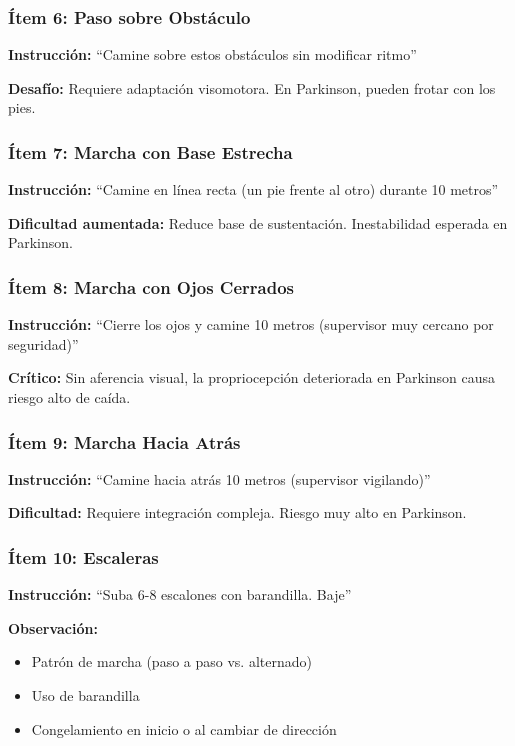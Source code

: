 \documentclass[12pt,a4paper,spanish,oneside]{book}
\begin{document}
\subsubsection{Ítem 6: Paso sobre Obstáculo}

\textbf{Instrucción:} ``Camine sobre estos obstáculos sin modificar ritmo''

\textbf{Desafío:} Requiere adaptación visomotora. En Parkinson, pueden frotar con los pies.

\subsubsection{Ítem 7: Marcha con Base Estrecha}

\textbf{Instrucción:} ``Camine en línea recta (un pie frente al otro) durante 10 metros''

\textbf{Dificultad aumentada:} Reduce base de sustentación. Inestabilidad esperada en Parkinson.

\subsubsection{Ítem 8: Marcha con Ojos Cerrados}

\textbf{Instrucción:} ``Cierre los ojos y camine 10 metros (supervisor muy cercano por seguridad)''

\textbf{Crítico:} Sin aferencia visual, la propriocepción deteriorada en Parkinson causa riesgo alto de caída.

\subsubsection{Ítem 9: Marcha Hacia Atrás}

\textbf{Instrucción:} ``Camine hacia atrás 10 metros (supervisor vigilando)''

\textbf{Dificultad:} Requiere integración compleja. Riesgo muy alto en Parkinson.

\subsubsection{Ítem 10: Escaleras}

\textbf{Instrucción:} ``Suba 6-8 escalones con barandilla. Baje''

\textbf{Observación:}
\begin{itemize}
  \item Patrón de marcha (paso a paso vs. alternado)
  \item Uso de barandilla
  \item Congelamiento en inicio o al cambiar de dirección
\end{itemize}
\end{document}
